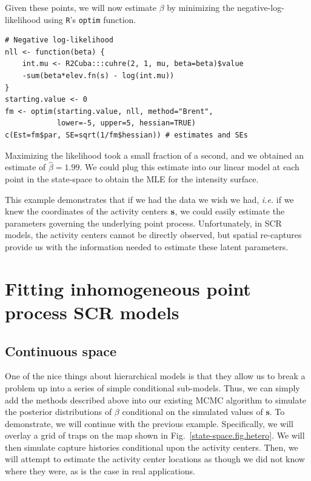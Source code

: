 Given these points, we will now estimate $\beta$ by minimizing the
negative-log-likelihood using \verb+R+'s \verb+optim+ function.

\begin{small}
\begin{verbatim}
# Negative log-likelihood
nll <- function(beta) {
    int.mu <- R2Cuba:::cuhre(2, 1, mu, beta=beta)$value
    -sum(beta*elev.fn(s) - log(int.mu))
}
starting.value <- 0
fm <- optim(starting.value, nll, method="Brent",
            lower=-5, upper=5, hessian=TRUE)
c(Est=fm$par, SE=sqrt(1/fm$hessian)) # estimates and SEs
\end{verbatim}
\end{small}


Maximizing the likelihood took a small fraction of a second, and we
obtained an estimate of $\hat{\beta}=1.99$. We could plug
this estimate into our linear model at each point in the state-space to
obtain the MLE for the intensity surface.

This example demonstrates
that if we had the data we wish we had, {\it i.e.} if we knew the
coordinates of the activity centers $\bf s$, we could easily estimate the
parameters governing the underlying point process. Unfortunately, in
SCR models, the activity centers cannot be directly observed, but
spatial re-captures provide us with the information needed to
estimate these latent parameters.

\section{Fitting inhomogeneous point process SCR models}

\subsection{Continuous space}

One of the nice things about hierarchical models is that they allow us
to break a problem up into a series of simple conditional
sub-models. Thus,
we can simply add the methods described above into our existing MCMC
algorithm to simulate the posterior distributions of $\beta$ conditional on the
simulated values of $\mathbf{s}$. To demonstrate, we will continue with
the previous example. Specifically, we will overlay a grid of
traps on the map shown in Fig.~\ref{state-space.fig.hetero}. We will then
simulate capture histories conditional upon the activity
centers. Then, we will attempt to estimate the activity center
locations as though we did not know where they were, as is the case in
real applications.

